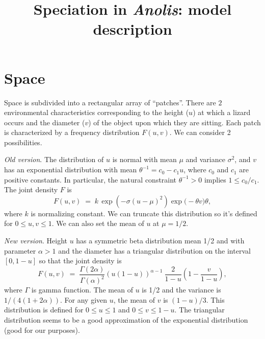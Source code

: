 \documentclass{article}
\begin{document}

\renewcommand{\baselinestretch}{1}
\normalsize

\title{Speciation in {\em Anolis}: model description}

\maketitle


\section{Space}

Space is subdivided into a rectangular array of ``patches''.
There are $2$ environmental characteristics corresponding to the height ($u$) at which a lizard occurs and the diameter ($v$) of the object upon which they are sitting.
Each patch is characterized by a frequency distribution $F(u,v)$. We can consider 2 possibilities.

{\em Old version}.\quad
The distribution of $u$ is normal with mean $\mu$ and variance $\sigma^2$, 
and $v$ has an exponential distribution with mean $\theta^{-1} = c_0 - c_1 u$,
where $c_0$ and $c_1$ are positive constants.
In particular, the natural constraint $\theta^{-1} > 0$ implies $1 \le c_0/c_1$.
The joint density $F$ is
\begin{equation} \label{gaus}
  F(u,v) \; = \;
  k \,\exp (- \sigma (u - \mu)^2 )\exp\Big(\!- \theta  v \Big) \theta,
\end{equation}
where $k$ is normalizing constant.
We can truncate this distribution so it's defined for $0\leq u,v \leq 1$.
We can also set the mean of $u$ at $\mu=1/2$.


{\em New version}.\quad
Height $u$ has a symmetric beta distribution mean 1/2 and with parameter $\alpha>1$ and the diameter has a triangular distribution on the interval $[0,1-u]$ so that the joint density is 
\begin{equation} \label{beta}
  F(u,v) \; = \;
  \frac{\Gamma(2\alpha)}{\Gamma(\alpha)^2} (u(1-u))^{\alpha-1}\ \frac{2}{1-u}(1-\frac{v}{1-u}),
\end{equation}
where $\Gamma$ is gamma function. The mean of $u$ is 1/2 and the variance is $1/(4(1+2\alpha))$.
For any given $u$, the mean of $v$ is $(1-u)/3$.
This distribution is defined for $0 \leq u \leq 1$ and $0 \leq v \leq 1-u$.
The triangular distribution seems to be a good approximation of the exponential distribution (good for our purposes).
\end{document}
